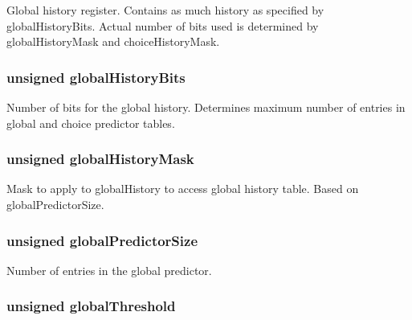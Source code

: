 \label{classTournamentBP_a48805f17e95aa944cb6eda2fcf061adf}
Global history register. Contains as much history as specified by globalHistoryBits. Actual number of bits used is determined by globalHistoryMask and choiceHistoryMask. \hypertarget{classTournamentBP_a64788f44637c4acaa30edab60e940f1e}{
\subsubsection[{globalHistoryBits}]{\setlength{\rightskip}{0pt plus 5cm}unsigned {\bf globalHistoryBits}}}
\label{classTournamentBP_a64788f44637c4acaa30edab60e940f1e}
Number of bits for the global history. Determines maximum number of entries in global and choice predictor tables. \hypertarget{classTournamentBP_a8a8a42593ca0c54c9cea34315edaf5fa}{
\subsubsection[{globalHistoryMask}]{\setlength{\rightskip}{0pt plus 5cm}unsigned {\bf globalHistoryMask}}}
\label{classTournamentBP_a8a8a42593ca0c54c9cea34315edaf5fa}
Mask to apply to globalHistory to access global history table. Based on globalPredictorSize. \hypertarget{classTournamentBP_ad3a4f2fc3c100e6baa69ece70da3cc07}{
\subsubsection[{globalPredictorSize}]{\setlength{\rightskip}{0pt plus 5cm}unsigned {\bf globalPredictorSize}}}
\label{classTournamentBP_ad3a4f2fc3c100e6baa69ece70da3cc07}
Number of entries in the global predictor. \hypertarget{classTournamentBP_ab40a9a7c94a0d33e3b1782a60c208c56}{
\subsubsection[{globalThreshold}]{\setlength{\rightskip}{0pt plus 5cm}unsigned {\bf globalThreshold}}}
